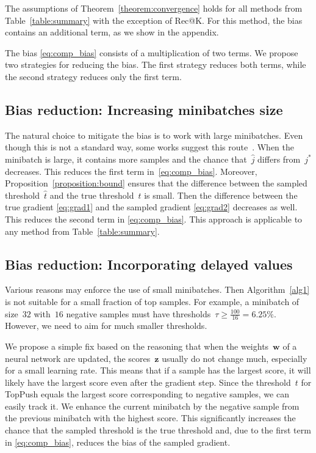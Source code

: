 The assumptions of Theorem~\ref{theorem:convergence} holds for all methods from Table~\ref{table:summary} with the exception of Rec@K. For this method, the bias contains an additional term, as we show in the appendix.

The bias \eqref{eq:comp_bias} consists of a multiplication of two terms. We propose two strategies for reducing the bias. The first strategy reduces both terms, while the second strategy reduces only the first term.

\subsection{Bias reduction: Increasing minibatches size}\label{sec:bias1}

The natural choice to mitigate the bias is to work with large minibatches. Even though this is not a standard way, some works suggest this route~\cite{you2019large}. When the minibatch is large, it contains more samples and the chance that~$\hat j$ differs from~$j^*$ decreases. This reduces the first term in~\eqref{eq:comp_bias}. Moreover, Proposition~\ref{proposition:bound} ensures that the difference between the sampled threshold~$\hat t$ and the true threshold~$t$ is small. Then the difference between the true gradient \eqref{eq:grad1} and the sampled gradient \eqref{eq:grad2} decreases as well. This reduces the second term in \eqref{eq:comp_bias}. This approach is applicable to any method from Table~\ref{table:summary}.

\subsection{Bias reduction: Incorporating delayed values}\label{sec:bias2}

Various reasons may enforce the use of small minibatches. Then Algorithm~\ref{alg1} is not suitable for a small fraction of top samples. For example, a minibatch of size~$32$ with~$16$ negative samples must have thresholds~$\tau\ge \frac{100}{16}=6.25\%$. However, we need to aim for much smaller thresholds.

We propose a simple fix based on the reasoning that when the weights~$\bm{w}$ of a neural network are updated, the scores~$\bm{z}$ usually do not change much, especially for a small learning rate. This means that if a sample has the largest score, it will likely have the largest score even after the gradient step. Since the threshold~$t$ for TopPush equals the largest score corresponding to negative samples, we can easily track it. We enhance the current minibatch by the negative sample from the previous minibatch with the highest score. This significantly increases the chance that the sampled threshold is the true threshold and, due to the first term in \eqref{eq:comp_bias}, reduces the bias of the sampled gradient.

